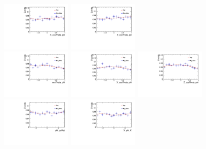 \begin{figure}[!hbtp]
\includegraphics[width=0.3\textwidth]{Figures/03_Zcs/app_sideband/X_cosTheta_psi.pdf}%
\includegraphics[width=0.3\textwidth]{Figures/03_Zcs/app_sideband/Z_cosTheta_psi.pdf}\\
\includegraphics[width=0.3\textwidth]{Figures/03_Zcs/app_sideband/cosTheta_phi.pdf}%
\includegraphics[width=0.3\textwidth]{Figures/03_Zcs/app_sideband/X_cosTheta_phi.pdf}%
\includegraphics[width=0.3\textwidth]{Figures/03_Zcs/app_sideband/Z_cosTheta_phi.pdf}\\
\includegraphics[width=0.3\textwidth]{Figures/03_Zcs/app_sideband/phi_psiKst.pdf}%
\includegraphics[width=0.3\textwidth]{Figures/03_Zcs/app_sideband/X_phi_K.pdf}%

\end{figure}

